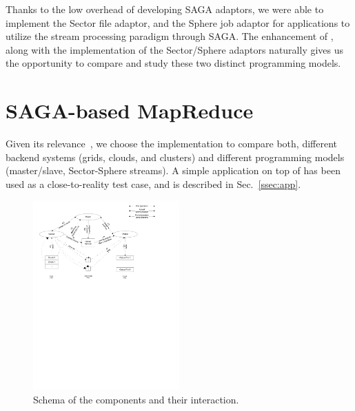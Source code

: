 \documentclass[3p,twocolumn]{elsarticle}
\begin{document}

Thanks to the low overhead of developing SAGA adaptors, we were able
to implement the Sector file adaptor, and the Sphere job adaptor for
applications to utilize the stream processing paradigm through SAGA.
The enhancement of \sagamapreduce, along with the implementation of the
Sector/Sphere adaptors naturally gives us the opportunity to compare
and study these two distinct programming models.


\section{SAGA-based MapReduce}
\label{sec:mr}

 Given its relevance~\cite{saga_ccgrid09}, we choose the \smr
 implementation to compare both, different backend systems (grids,
 clouds, and clusters) and different programming models (master/slave,
 Sector-Sphere streams).  A simple \wc application on top of
 \smr has been used as a close-to-reality test case, and is
 described in Sec.~\ref{ssec:app}.

\begin{figure}[htb!]
 \includegraphics[width=0.5\textwidth, trim=0.5cm 17cm 3cm 0, clip]{figures/saga_mr_schema.pdf}
 \caption{
   Schema of the \sagamapreduce components and their interaction.
   \label{fig:saga_mr_schema}
   }
\end{figure}
\end{document}
